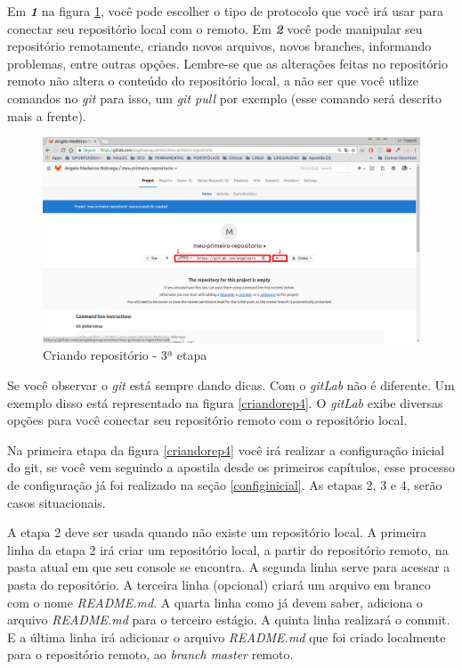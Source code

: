 \documentclass[12pt,openright,oneside,a4paper,english,brazil]{abntex2}
\begin{document}
Em \textbf{\textit{1}} na figura \ref{criandorep3}, você pode escolher o tipo de protocolo que você irá usar para conectar seu repositório local com o remoto. Em \textbf{\textit{2}}  você pode manipular seu repositório remotamente, criando novos arquivos, novos branches, informando problemas, entre outras opções. Lembre-se que as alterações feitas no repositório remoto não altera o conteúdo do repositório local, a não ser que você utlize comandos no \textit{git} para isso, um \textit{git pull} por exemplo (esse comando será descrito mais a frente).

\begin{figure}[h]
	\caption{\label{criandorep3}Criando repositório - 3ª etapa}
	\begin{center}
		\includegraphics[width=1\linewidth]{imagens/criandorep3}
	\end{center}
\end{figure}

Se você observar o \textit{git} está sempre dando dicas. Com o \textit{gitLab} não é diferente. Um exemplo disso está representado na figura \ref{criandorep4}. O \textit{gitLab} exibe diversas opções para você conectar seu repositório remoto com o repositório local. 

Na primeira etapa da figura \ref{criandorep4} você irá realizar a configuração inicial do git, se você vem seguindo a apostila desde os primeiros capítulos, esse processo de configuração já foi realizado na seção \ref{configinicial}. As etapas 2, 3 e 4, serão casos situacionais. 

A etapa 2 deve ser usada quando não existe um repositório local. A primeira linha da etapa 2 irá criar um repositório local, a partir do repositório remoto, na pasta atual em que seu console se encontra. A segunda linha serve para acessar a pasta do repositório. A terceira linha (opcional) criará um arquivo em branco com o nome \textit{README.md}. A quarta linha como já devem saber, adiciona o arquivo \textit{README.md} para o terceiro estágio. A quinta linha realizará o commit. E a última linha irá adicionar o arquivo \textit{README.md} que foi criado localmente para o repositório remoto, ao \textit{branch master} remoto.
\end{document}
